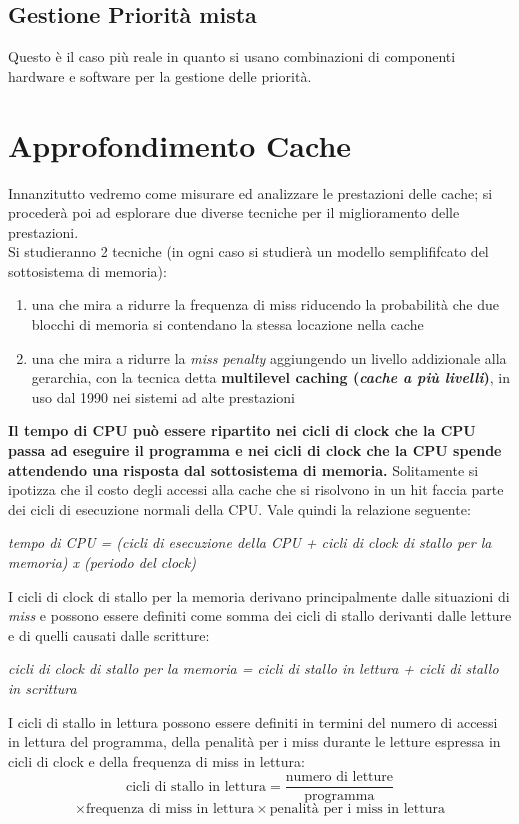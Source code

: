 \documentclass[a4paper,12pt, oneside]{book}
\begin{document}
\subsection{Gestione Priorità mista}
Questo è il caso più reale in quanto si usano combinazioni di
componenti hardware e software per la gestione delle priorità.\\
\section{Approfondimento Cache}
Innanzitutto vedremo come misurare ed analizzare le prestazioni delle
cache; si procederà poi ad esplorare due diverse tecniche
per il miglioramento delle prestazioni.\\
Si studieranno 2 tecniche (in ogni caso si studierà un modello
semplififcato del sottosistema di memoria):
\begin{enumerate}
  \item una che mira a ridurre la frequenza di miss riducendo la
  probabilità che due blocchi di memoria si
  contendano la stessa locazione nella cache
  \item una che mira a ridurre la \textit{miss penalty} aggiungendo un
  livello addizionale alla gerarchia, con la tecnica detta
  \textbf{multilevel caching (\textit{cache a più livelli})}, in uso
  dal 1990 nei sistemi ad alte prestazioni
\end{enumerate}
\textbf{Il tempo di CPU può essere ripartito nei cicli di clock che la
  CPU passa ad eseguire il programma e nei cicli di clock che la CPU
  spende attendendo una risposta dal sottosistema di memoria.}
Solitamente si ipotizza che il costo degli accessi alla
cache che si risolvono in un hit faccia parte dei cicli di esecuzione
normali della CPU. Vale quindi la relazione seguente:
\begin{center}
\textit{tempo di CPU = (cicli di esecuzione della CPU + cicli di clock di stallo
per la memoria) x (periodo del clock)}
\end{center}
I cicli di clock di stallo per la memoria derivano principalmente dalle
situazioni di \textit{miss} e possono essere definiti come somma dei cicli
di stallo derivanti dalle letture e di quelli causati dalle scritture:
\begin{center}
\textit{cicli di clock di stallo per la memoria =
cicli di stallo in lettura + cicli di stallo in scrittura}
\end{center}
I cicli di stallo in lettura possono essere definiti in termini del
numero di accessi in lettura del programma, della penalità per i miss
durante le letture espressa in cicli di clock e della frequenza di
miss in lettura:
\[\mbox{cicli di stallo in lettura} = \frac{\mbox{numero di
      letture}}{\mbox{programma}}\]
\[\times \mbox{frequenza di miss in lettura} \times \mbox{penalità per i miss in lettura}\]
\end{document}
